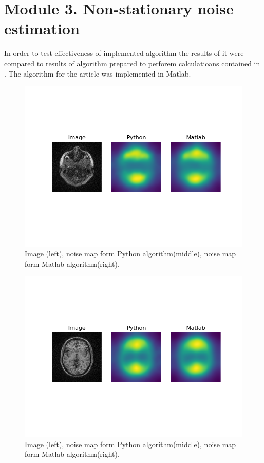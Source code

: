 \section{Module 3. Non-stationary noise estimation}
In order to test effectiveness of implemented algorithm the results of it were compared to results of algorithm prepared to perforem calculatioans contained in \cite{aja2015spatially}. The algorithm for the article was implemented in Matlab.
\begin{figure}[H]
	\centering{}
		\includegraphics[scale=0.7]{figures/module03/10_comp}
	\caption{Image (left), noise map form Python algorithm(middle), noise map form Matlab algorithm(right).} 
\end{figure}
\begin{figure}[H]
	\centering{}
		\includegraphics[scale=0.7]{figures/module03/70_comp}
	\caption{Image (left), noise map form Python algorithm(middle), noise map form Matlab algorithm(right).} 
\end{figure}
